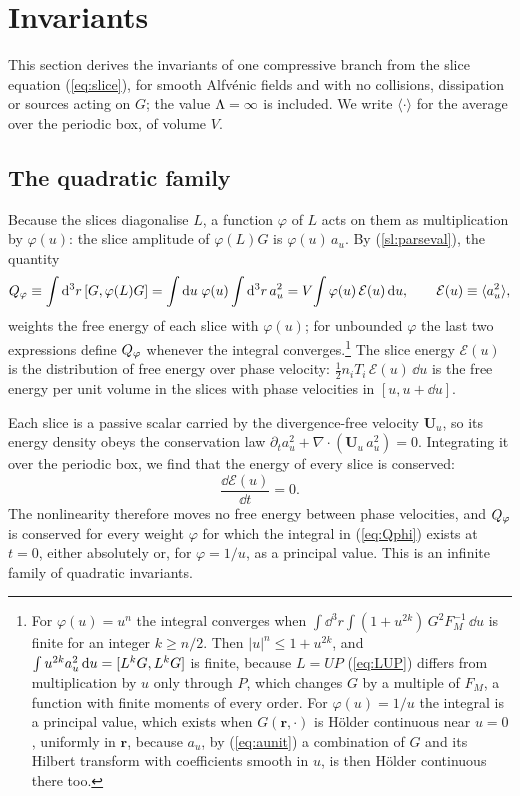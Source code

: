 \section{Invariants}\label{sec:invariants}

This section derives the invariants of one compressive branch from the slice equation (\ref{eq:slice}), for smooth Alfv\'enic fields and with no collisions, dissipation or sources acting on $G$; the value $\Lambda=\infty$ is included. We write $\langle\cdot\rangle$ for the average over the periodic box, of volume $V$.

\subsection{The quadratic family}\label{inv:family}

Because the slices diagonalise $L$, a function $\varphi$ of $L$ acts on them as multiplication by $\varphi(u)$: the slice amplitude of $\varphi(L)G$ is $\varphi(u)\,a_u$. By (\ref{sl:parseval}), the quantity
\begin{equation}\label{eq:Qphi}
  Q_\varphi\equiv\int\mathrm{d}^3r\,[G,\varphi(L)G]=\int\mathrm{d} u\;\varphi(u)\int\mathrm{d}^3r\,a_u^2=V\!\int\varphi(u)\,\mathcal E(u)\,\mathrm{d} u,
  \qquad \mathcal E(u)\equiv\langle a_u^2\rangle ,
\end{equation}
weights the free energy of each slice with $\varphi(u)$; for unbounded $\varphi$ the last two expressions define $Q_\varphi$ whenever the integral converges.\footnote{For $\varphi(u)=u^n$ the integral converges when $\int\dd^3r\int(1+u^{2k})\,G^2F_M^{-1}\,\dd u$ is finite for an integer $k\ge n/2$. Then $|u|^n\le1+u^{2k}$, and $\int u^{2k}a_u^2\,\mathrm{d} u=[L^kG,L^kG]$ is finite, because $L=UP$ (\ref{eq:LUP}) differs from multiplication by $u$ only through $P$, which changes $G$ by a multiple of $F_M$, a function with finite moments of every order. For $\varphi(u)=1/u$ the integral is a principal value, which exists when $G(\boldsymbol r,\cdot)$ is H\"older continuous near $u=0$, uniformly in $\boldsymbol r$, because $a_u$, by (\ref{eq:aunit}) a combination of $G$ and its Hilbert transform with coefficients smooth in $u$, is then H\"older continuous there too.} The slice energy $\mathcal E(u)$ is the distribution of free energy over phase velocity: $\tfrac12n_iT_i\,\mathcal E(u)\,\dd u$ is the free energy per unit volume in the slices with phase velocities in $[u,u+\dd u]$.

Each slice is a passive scalar carried by the divergence-free velocity $\boldsymbol U_u$, so its energy density obeys the conservation law $\partial_ta_u^2+\nabla\cdot(\boldsymbol U_u\,a_u^2)=0$. Integrating it over the periodic box, we find that the energy of every slice is conserved:
\begin{equation}\label{inv:energy}
  \frac{\dd\mathcal E(u)}{\dd t}=0 .
\end{equation}
The nonlinearity therefore moves no free energy between phase velocities, and $Q_\varphi$ is conserved for every weight $\varphi$ for which the integral in (\ref{eq:Qphi}) exists at $t=0$, either absolutely or, for $\varphi=1/u$, as a principal value. This is an infinite family of quadratic invariants.

